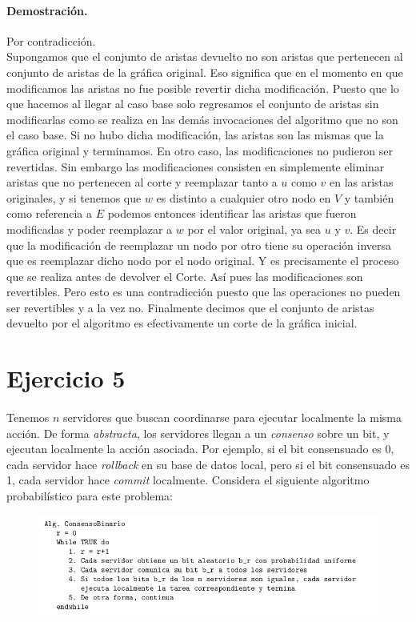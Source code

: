 \documentclass[12pt]{article}
\begin{document}
\paragraph{Demostración.} Por contradicción.\\
Supongamos que el conjunto de aristas devuelto no son aristas que pertenecen al conjunto de aristas de la gráfica original. Eso significa que en el momento en que modificamos las aristas no fue posible revertir dicha modificación. Puesto que lo que hacemos al llegar al caso base solo regresamos el conjunto de aristas sin modificarlas como se realiza en las demás invocaciones del algoritmo que no son el caso base. Si no hubo dicha modificación, las aristas son las mismas que la gráfica original y terminamos. En otro caso, las modificaciones no pudieron ser revertidas. Sin embargo las modificaciones consisten en simplemente eliminar aristas que no pertenecen al corte y reemplazar tanto a $u$ como $v$ en las aristas originales, y si tenemos que $w$ es distinto a cualquier otro nodo en $V$ y también como referencia a $E$ podemos entonces identificar las aristas que fueron modificadas y poder reemplazar a $w$ por el valor original, ya sea $u$ y $v$. Es decir que la modificación de reemplazar un nodo por otro tiene su operación inversa que es reemplazar dicho nodo por el nodo original. Y es precisamente el proceso que se realiza antes de devolver el Corte. Así pues las modificaciones son revertibles. Pero esto es una contradicción puesto que las operaciones no pueden ser revertibles y a la vez no. Finalmente decimos que el conjunto de aristas devuelto por el algoritmo es efectivamente un corte de la gráfica inicial.
\pagebreak
\section{Ejercicio 5}
\paragraph{} Tenemos $n$ servidores que buscan coordinarse para ejecutar localmente la misma acción. De forma \textit{abstracta}, los servidores llegan a un \textit{consenso} sobre un bit, y ejecutan localmente la acción asociada. Por ejemplo, si el bit consensuado es 0, cada servidor hace \textit{rollback} en su base de datos local, pero si el bit consensuado es 1, cada servidor hace \textit{commit} localmente. Considera el siguiente algoritmo probabilístico para este problema:
\begin{figure}[h]
	\begin{center}
		\includegraphics[width=\textwidth]{AlgoProba}
	\end{center}
\end{figure}
\end{document}
